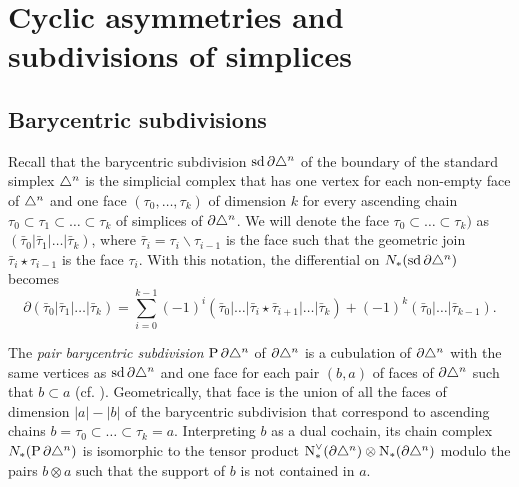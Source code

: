 
\section{Cyclic asymmetries and subdivisions of simplices}\label{section:atlast}

\subsection{Barycentric subdivisions}\label{s:assembly}

Recall that the barycentric subdivision $\operatorname{sd} \partial\triangle^n$ of the boundary of the standard simplex $\triangle^n$ is the simplicial complex that has one vertex for each non-empty face of $\triangle^n$ and one face $(\tau_0,\ldots,\tau_k)$ of dimension $k$ for every ascending chain $\tau_0\subset \tau_1\subset\ldots \subset \tau_k$ of simplices of $\partial \triangle^n$. We will denote the face $\tau_0\subset \ldots\subset \tau_k)$ as $(\bar{\tau}_0|\bar{\tau}_1|\ldots|\bar{\tau}_k)$, where $\bar{\tau}_i = \tau_i\smallsetminus \tau_{i-1}$ is the face such that the geometric join $\bar{\tau}_i\star \tau_{i-1}$ is the face $\tau_i$. With this notation, the differential on $N_{*}(\operatorname{sd} \partial \triangle^n)$ becomes
\[
\partial(\bar{\tau}_0|\bar{\tau}_1|\ldots|\bar{\tau}_k) = \sum_{i=0}^{k-1} (-1)^i(\bar{\tau}_0|\ldots|\bar{\tau}_i\star \bar{\tau}_{i+1}|\ldots |\bar{\tau}_k) + (-1)^k (\bar{\tau}_0|\ldots|\bar{\tau}_{k-1}).
\]

The \emph{pair barycentric subdivision} $\operatorname{P} \partial\triangle^n$ of $\partial \triangle^n$ is a cubulation of $\partial \triangle^n$ with the same vertices as $\operatorname{sd} \partial \triangle^n$ and one face for each pair $(b,a)$ of faces of $\partial\triangle^n$ such that $b\subset a$ (cf. \cite{Rounds2010}). Geometrically, that face is the union of all the faces of dimension $|a|-|b|$ of the barycentric subdivision that correspond to ascending chains $b = \tau_0\subset \ldots\subset \tau_k= a$. Interpreting $b$ as a dual cochain, its chain complex $N_{*}(\operatorname{P} \partial\triangle^n)$ is isomorphic to the tensor product $\operatorname{N}^\vee_{*}(\partial\triangle^n)\otimes \operatorname{N}_{*}(\partial\triangle^n)$ modulo the pairs $b\otimes a$ such that the support of $b$ is not contained in $a$.


